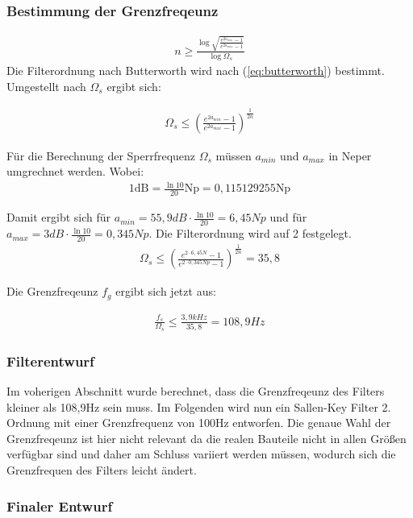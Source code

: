 \subsubsection{Bestimmung der Grenzfreqeunz}
\begin{align}
n \ge \frac{\log{\sqrt{\frac{e^{2a_{min}}-1}{e^{2a_{max}}-1}}}}{\log{\Omega_s}}
\label{eq:butterworth}
\end{align}
Die Filterordnung nach Butterworth wird nach (\ref{eq:butterworth}) bestimmt. Umgestellt nach $\Omega_s$ ergibt sich:

\begin{align}
\Omega_s \le  \left(\frac{e^{2a_{min}}-1}{e^{2a_{max}}-1}\right)^{\frac{1}{2n}}
\end{align}



Für die Berechnung der Sperrfrequenz $\Omega_s$ müssen  $a_{min}$ und $a_{max}$ in Neper umgrechnet werden. Wobei:
\begin{align*}
1 \text{dB} =  \frac{\ln{10}}{20}\text{Np} = 0,115129255 \text{Np}   
\end{align*}

Damit ergibt sich für $a_{min}=55,9 dB\cdot \frac{\ln{10}}{20}=6,45Np$ und für  $a_{max}=3 dB\cdot \frac{\ln{10}}{20}=0,345Np$. Die Filterordnung wird auf 2 festgelegt.
\begin{align}
\Omega_s \le  \left(\frac{e^{2\cdot6,45N }-1}{e^{2\cdot 0,345Np}-1}\right)^{\frac{1}{2n}}  = 35,8
\end{align}

Die Grenzfreqeunz $f_g$ ergibt sich jetzt aus:

\begin{align}
\frac{f_s}{\Omega_s} \le \frac{3,9kHz}{35,8} = 108,9Hz
\end{align}

\subsubsection{Filterentwurf}
Im voherigen Abschnitt wurde berechnet, dass die Grenzfreqeunz des Filters kleiner als 108,9Hz sein muss.
Im Folgenden wird nun ein Sallen-Key Filter 2. Ordnung mit einer Grenzfrequenz von 100Hz entworfen.
Die genaue Wahl der Grenzfreqeunz ist hier nicht relevant da die realen Bauteile nicht in  allen Größen 
verfügbar sind und daher am Schluss variiert werden müssen, wodurch sich die Grenzfrequen des Filters leicht ändert.


\subsubsection{Finaler Entwurf}



